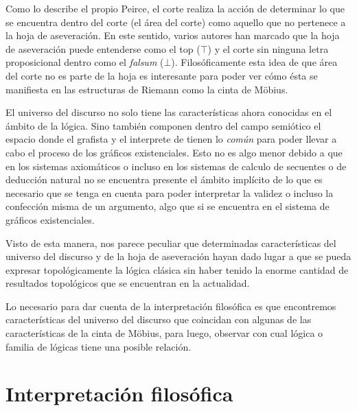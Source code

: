 \documentclass[
	fontsize=10pt, %
	twoside=true, %
	secnumdepth=1, %
	abstract=true, %
]{kaohandt}
\begin{document}
Como lo describe el propio Peirce, el corte realiza la acción de determinar lo que se encuentra dentro del corte (el área del corte) como aquello que no pertenece a la hoja de aseveración. En este sentido, varios autores han marcado que la hoja de aseveración puede entenderse como el top ($\top$) y el corte sin ninguna letra proposicional dentro como el \textit{falsum} ($\bot$). Filosóficamente esta idea de que área del corte no es parte de la hoja es interesante para poder ver cómo ésta se manifiesta en las estructuras de Riemann como la cinta de Möbius.

El universo del discurso no solo tiene las características ahora conocidas en el ámbito de la lógica. Sino también componen dentro del campo semiótico el espacio donde el grafista y el interprete de tienen lo \emph{común} para poder llevar a cabo el proceso de los gráficos existenciales. Esto no es algo menor debido a que en los sistemas axiomáticos o incluso en los sistemas de calculo de secuentes o de deducción natural no se encuentra presente el ámbito implícito de lo que es necesario que se tenga en cuenta para poder interpretar la validez o incluso la confección misma de un argumento, algo que si se encuentra en el sistema de gráficos existenciales.

Visto de esta manera, nos parece peculiar que determinadas características del universo del discurso y de la hoja de aseveración hayan dado lugar a que se pueda expresar topológicamente la lógica clásica sin haber tenido la enorme cantidad de resultados topológicos que se encuentran en la actualidad.

Lo necesario para dar cuenta de la interpretación filosófica es que encontremos características del universo del discurso que coincidan con algunas de las características de la cinta de Möbius, para luego, observar con cual lógica o familia de lógicas tiene una posible relación.


\section{Interpretación filosófica} %
\label{sec:Interpretación filosófica}
\end{document}
